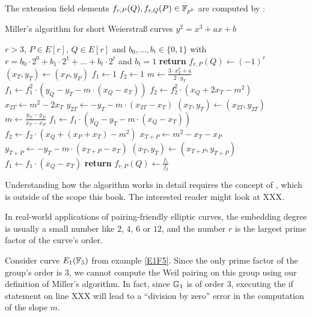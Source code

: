 The extension field elements $f_{r,P}(Q), f_{r,Q}(P)\in \mathbb{F}_{p^k}$ are computed by :
\begin{algorithm}\caption{Miller's algorithm for short Weierstraß curves $y^2 = x^3 +ax +b$}
\begin{algorithmic}[0]
\Require $r>3$, $P \in E[r]$, $Q\in E[r]$ and
\State $b_0,\ldots, b_t\in \{0,1\}$ with $r= b_0\cdot 2^0 + b_1\cdot 2^1 + \ldots + b_t\cdot 2^t$ and $b_t=1$
	\State \textbf{return} $f_{r,P}(Q) \gets (-1)^r$
\EndIf
\State $(x_T,y_T) \gets (x_P,y_P)$
\State $f_1\gets 1$
\State $f_2\gets 1$
	\State $m \gets \frac{3\cdot x_T^2+a}{2\cdot y_T}$	
    \State $f_1 \gets f_1^2\cdot (y_Q - y_T - m\cdot(x_Q-x_T))$
	\State $f_2 \gets f_2^2\cdot (x_Q + 2x_T -m^2)$
	\State $x_{2T} \gets m^2 - 2 x_T$
	\State $y_{2T} \gets -y_T - m\cdot (x_{2T}-x_T)$
	\State $(x_T,y_T)\gets (x_{2T},y_{2T})$ 
		\State $m \gets \frac{y_T -y_P}{x_T - x_P}$
		\State $f_1 \gets f_1\cdot (y_Q -y_T -m\cdot (x_Q - x_T))$
		\State $f_2 \gets f_2\cdot (x_Q + (x_P+x_T) - m^2)$
		\State $x_{T+P} \gets m^2 -x_T -x_P$
		\State $y_{T+P}\gets -y_T - m\cdot (x_{T+P}-x_T)$
		\State $(x_T,y_T)\gets (x_{T+P},y_{T+P})$
	\EndIf
\EndFor
\State $f_1 \gets f_1\cdot (x_Q - x_T)$
\State \textbf{return} $f_{r,P}(Q) \gets \frac{f_1}{f_2}$
\EndProcedure
\end{algorithmic}
\end{algorithm}

Understanding how the algorithm works in detail requires the concept of , which is outside of the scope this book. The interested reader might look at XXX.

In real-world applications of pairing-friendly elliptic curves, the embedding degree is usually a small number like $2$, $4$, $6$ or $12$, and the number $r$ is the largest prime factor of the curve's order.

\begin{example}Consider curve $E_1(\mathbb{F}_5)$ from example \ref{E1F5}. Since the only prime factor of the group's order is $3$, we cannot compute the Weil pairing on this group using our definition of Miller's algorithm. In fact, since $\mathbb{G}_1$ is of order $3$, executing the if statement on line XXX will lead to a ``division by zero'' error in the computation of the slope $m$.
\end{example}

